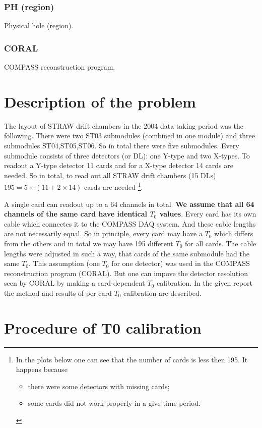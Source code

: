 \documentclass[a4paper,12pt]{article}
\begin{document}
\subsubsection*{PH (region)}
Physical hole (region).

\subsubsection*{CORAL}
COMPASS reconstruction program.

\section{Description of the problem}
\label{ch:Problem description}
The layout of STRAW drift chambers in the 2004 data taking period was the following.
There were two ST03 submodules (combined in one module) and three submodules
ST04,ST05,ST06. So in total there were five submodules. Every submodule consists
of three detectors (or DL): one Y-type and two X-types. To readout a Y-type detector
11 cards and for a X-type detector 14 cards are needed.
So in total, to read out all STRAW drift chambers (15 DLs)
$195 = 5 \times (11 + 2 \times 14)$ cards are needed
\footnote{In the plots below one can see that the number of cards is less then 195.
It happens because
\begin{itemize}
\item there were some detectors with missing cards;
\item some cards did not work properly in a give time period.
\end{itemize}}.

A single card can readout up to a 64
channels in total. {\bf We assume that all 64 channels of the same card have identical
$T_0$ values}. Every card has its own cable which connectes it to
the COMPASS DAQ system. And these cable lengths are not necessarily equal.
So in principle, every card may have a $T_0$ which differs
from the others and in total we may have 195 different $T_0$ for all cards.
The cable lengths were adjusted in such a way, that cards of the same submodule
had the same $T_0$. This assumption (one $T_0$ for one detector) was used in
the COMPASS reconstruction program (CORAL). But one can impove the detector
resolution seen by CORAL by making a card-dependent $T_0$ calibration.
In the given report the method and results of per-card $T_0$ calibration
are described.

\section{Procedure of T0 calibration}
\end{document}
